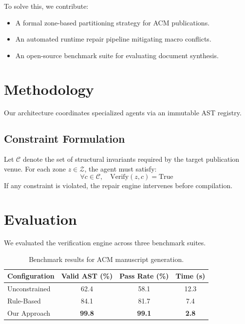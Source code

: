 \documentclass[10pt,twocolumn]{article}
\begin{document}
To solve this, we contribute:
\begin{itemize}
  \item A formal zone-based partitioning strategy for ACM publications.
  \item An automated runtime repair pipeline mitigating macro conflicts.
  \item An open-source benchmark suite for evaluating document synthesis.
\end{itemize}

\section{Methodology}
Our architecture coordinates specialized agents via an immutable AST registry.

\subsection{Constraint Formulation}
Let $\mathcal{C}$ denote the set of structural invariants required by the target publication venue. For each zone $z \in \mathcal{Z}$, the agent must satisfy:
\begin{equation}
\forall c \in \mathcal{C}, \quad \text{Verify}(z, c) = \text{True}
\end{equation}
If any constraint is violated, the repair engine intervenes before compilation.

\section{Evaluation}
We evaluated the verification engine across three benchmark suites.

\begin{table}[ht]
\centering
\caption{Benchmark results for ACM manuscript generation.}
\label{tab:acm_results}
\begin{tabular}{lccc}
\toprule
\textbf{Configuration} & \textbf{Valid AST (\%)} & \textbf{Pass Rate (\%)} & \textbf{Time (s)} \\
\midrule
Unconstrained & 62.4 & 58.1 & 12.3 \\
Rule-Based    & 84.1 & 81.7 & 7.4  \\
Our Approach  & \textbf{99.8} & \textbf{99.1} & \textbf{2.8}  \\
\bottomrule
\end{tabular}
\end{table}
\end{document}

